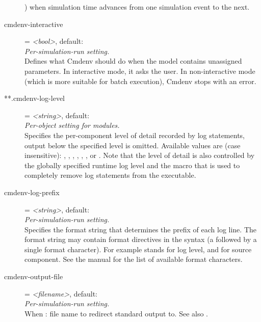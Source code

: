\begin{description}
    )
    when simulation time advances from one simulation event to the next.
\item[cmdenv-interactive] = \textit{<bool>}, default: \\
    \textit{Per-simulation-run setting.}\\
    Defines what Cmdenv should do when the model contains unassigned
    parameters. In interactive mode, it asks the user. In non-interactive mode
    (which is more suitable for batch execution), Cmdenv stops with an error.
\item[**.cmdenv-log-level] = \textit{<string>}, default: \\
    \textit{Per-object setting for modules.}\\
    Specifies the per-component level of detail recorded by log statements,
    output below the specified level is omitted. Available values are (case
    insensitive): , , , , ,
    ,  or . Note that the level of detail is
    also controlled by the globally specified runtime log level and the
     macro that is used to completely remove log
    statements from the executable.
\item[cmdenv-log-prefix] = \textit{<string>}, default: \ttt{[\%l]	}\\
    \textit{Per-simulation-run setting.}\\
    Specifies the format string that determines the prefix of each log line.
    The format string may contain format directives in the syntax  (a
    \ttt{\%} followed by a single format character).  For example 
    stands for log level, and  for source component. See the manual
    for the list of available format characters.
\item[cmdenv-output-file] = \textit{<filename>}, default: \\
    \textit{Per-simulation-run setting.}\\
    When
    :
    file name to redirect standard output to. See also
    .

\end{description}
